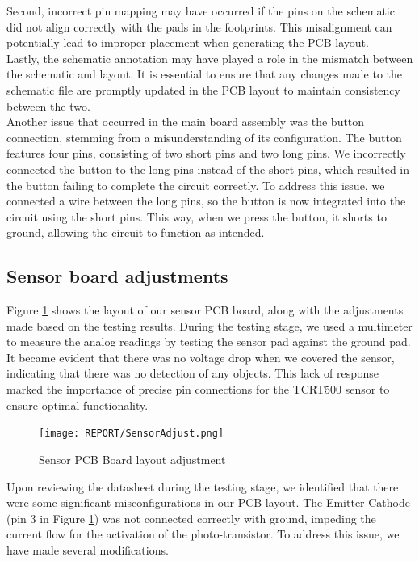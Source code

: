 Second, incorrect pin mapping may have occurred if the pins on the schematic did not align correctly with the pads in the footprints. This misalignment can potentially lead to improper placement when generating the PCB layout.  
\\

Lastly, the schematic annotation may have played a role in the mismatch between the schematic and layout. It is essential to ensure that any changes made to the schematic file are promptly updated in the PCB layout to maintain consistency between the two. 
\\

Another issue that occurred in the main board assembly was the button connection, stemming from a misunderstanding of its configuration. The button features four pins, consisting of two short pins and two long pins. We incorrectly connected the button to the long pins instead of the short pins, which resulted in the button failing to complete the circuit correctly. To address this issue, we connected a wire between the long pins, so the button is now integrated into the circuit using the short pins. This way, when we press the button, it shorts to ground, allowing the circuit to function as intended. 

\subsection{Sensor board adjustments}
Figure \ref{fig:SensorAdjust} shows the layout of our sensor PCB board, along with the adjustments made based on the testing results. During the testing stage, we used a multimeter to measure the analog readings by testing the sensor pad against the ground pad. It became evident that there was no voltage drop when we covered the sensor, indicating that there was no detection of any objects. This lack of response marked the importance of precise pin connections for the TCRT500 sensor to ensure optimal functionality. 

\begin{figure}[H]
    \centering
    \texttt{[image: REPORT/SensorAdjust.png]}
    \caption{Sensor PCB Board layout adjustment}
    \label{fig:SensorAdjust}
\end{figure}

Upon reviewing the datasheet during the testing stage, we identified that there were some significant misconfigurations in our PCB layout. The Emitter-Cathode (pin 3 in Figure \ref{fig:SensorAdjust}) was not connected correctly with ground, impeding the current flow for the activation of the photo-transistor. To address this issue, we have made several modifications.  
\\

